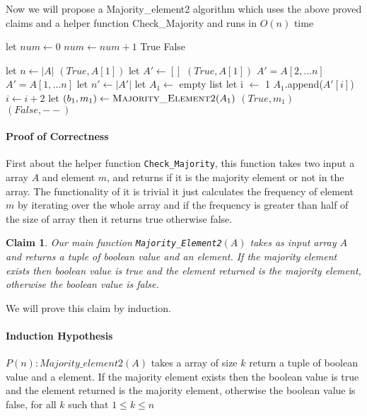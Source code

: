 \documentclass[answers]{exam}
\newtheorem{claim}{Claim}
\begin{document}
\begin{questions}
\begin{parts}
\begin{solution}
Now we will propose a Majority\_element2 algorithm which uses the above proved claims and a helper function Check\_Majority and runs in $O(n)$ time


\begin{algorithmic}[1]
\State let $num \gets 0$
\State $num \gets num+1$
\EndIf
\EndFor
{}
\State \Return True
\Else 
\State \Return False
\EndIf
\EndFunction
\end{algorithmic}
\begin{algorithmic}[1]

\State let $n \gets |A|$
\State \Return $(True,A[1])$
\EndIf
\State let $A' \gets []$
\State \Return $(True,A[1])$
\EndIf
\State $A'=A[2,...n]$
\Else
\State $A'=A[1,...n]$
\EndIf
\State let $n' \gets |A'| $
\State let $A_{1} \gets $ empty list
\State let i $\gets$ 1
\State $A_{1}$.append($A'[i]$)
\EndIf
\State $i \gets i+2$
\EndWhile
\State let $(b_{1},m_{1}) \gets \Call{Majority\_Element2}{A_{1}}$
\State \Return $(True, m_{1})$
\EndIf
\EndIf
\State \Return $(False, --)$
\EndFunction
\end{algorithmic}

\paragraph{Proof of Correctness} 
First about the helper function \texttt{Check\_Majority}, this function takes two input a array $A$ and element $m$, and returns if it is the majority element or not in the array. The functionality of it is trivial it just calculates the frequency of element $m$ by iterating over the whole array and if the frequency is greater than half of the size of array then it returns true otherwise false.


\begin{claim} Our main function \texttt{Majority\_Element2}$(A)$ takes as input array $A$ and  returns a tuple of boolean value and an element. If the majority element exists then boolean value is true and the element returned is the majority element, otherwise the boolean value is false.
\end{claim}

We will prove this claim by induction.
\paragraph{Induction Hypothesis} $P(n): Majority\_element2(A)$ takes a array of size $k$ return a tuple of boolean value and a element. If the majority element exists then the boolean value is true and the element returned is the majority element, otherwise the boolean value is false, for all $k$ such that $1\leq k \leq n$


\end{solution}
\end{parts}
\end{questions}
\end{document}
